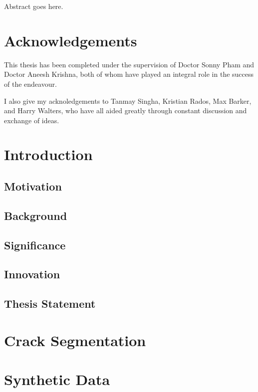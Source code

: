 \documentclass[a4paper,12pt]{report}
\begin{document}
Abstract goes here. 

\newpage
\chapter*{Acknowledgements}
This thesis has been completed under the supervision of Doctor Sonny Pham and Doctor Aneesh Krishna, both of whom have played an integral role in the success of the endeavour.

\noindent I also give my acknoledgements to Tanmay Singha, Kristian Rados, Max Barker, and Harry Walters, who have all aided greatly through constant discussion and exchange of ideas.

\newpage
\tableofcontents
\newpage
\listoffigures
\newpage
\listoftables
\newpage
\thispagestyle{empty}

\chapter{Introduction}

    \section{Motivation}
    
    \section{Background}
    
    \section{Significance}

    \section{Innovation}
    
    \section{Thesis Statement}

\chapter{Crack Segmentation}
    
\chapter{Synthetic Data}
\end{document}
